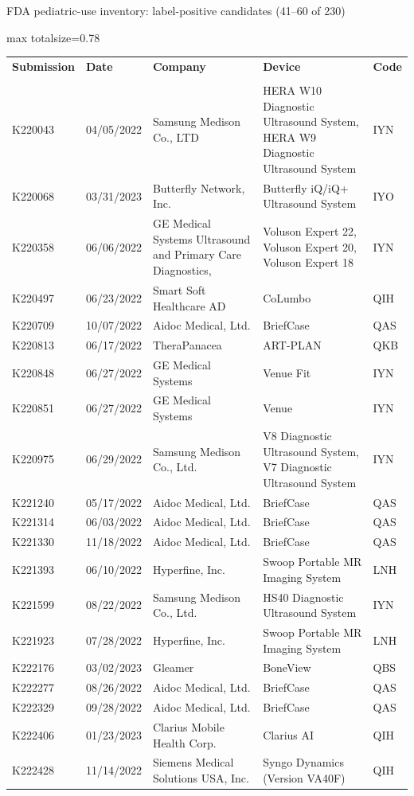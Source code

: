 \documentclass[aspectratio=169]{beamer}
\renewcommand{\arraystretch}{1.08}
\begin{document}
\begin{frame}[category=FDA appendix]{FDA pediatric-use inventory: label-positive candidates (41--60 of 230)}
\begin{adjustbox}{max totalsize={\textwidth}{0.78\textheight}}
\renewcommand{\arraystretch}{1.2}
\begin{tabular}{|p{}|p{}|p{}|p{}|p{}|}
\hline \textbf{Submission} & \textbf{Date} & \textbf{Company} & \textbf{Device} & \textbf{Code} \\\\ \hline
K220043 & 04/05/2022 & Samsung Medison Co., LTD & HERA W10 Diagnostic Ultrasound System, HERA W9 Diagnostic Ultrasound System & IYN \\ \hline
K220068 & 03/31/2023 & Butterfly Network, Inc. & Butterfly iQ/iQ+ Ultrasound System & IYO \\ \hline
K220358 & 06/06/2022 & GE Medical Systems Ultrasound and Primary Care Diagnostics, & Voluson Expert 22, Voluson Expert 20, Voluson Expert 18 & IYN \\ \hline
K220497 & 06/23/2022 & Smart Soft Healthcare AD & CoLumbo & QIH \\ \hline
K220709 & 10/07/2022 & Aidoc Medical, Ltd. & BriefCase & QAS \\ \hline
K220813 & 06/17/2022 & TheraPanacea & ART-PLAN & QKB \\ \hline
K220848 & 06/27/2022 & GE Medical Systems & Venue Fit & IYN \\ \hline
K220851 & 06/27/2022 & GE Medical Systems & Venue & IYN \\ \hline
K220975 & 06/29/2022 & Samsung Medison Co., Ltd. & V8 Diagnostic Ultrasound System, V7 Diagnostic Ultrasound System & IYN \\ \hline
K221240 & 05/17/2022 & Aidoc Medical, Ltd. & BriefCase & QAS \\ \hline
K221314 & 06/03/2022 & Aidoc Medical, Ltd. & BriefCase & QAS \\ \hline
K221330 & 11/18/2022 & Aidoc Medical, Ltd. & BriefCase & QAS \\ \hline
K221393 & 06/10/2022 & Hyperfine, Inc. & Swoop Portable MR Imaging System & LNH \\ \hline
K221599 & 08/22/2022 & Samsung Medison Co., Ltd. & HS40 Diagnostic Ultrasound System & IYN \\ \hline
K221923 & 07/28/2022 & Hyperfine, Inc. & Swoop Portable MR Imaging System & LNH \\ \hline
K222176 & 03/02/2023 & Gleamer & BoneView & QBS \\ \hline
K222277 & 08/26/2022 & Aidoc Medical, Ltd. & BriefCase & QAS \\ \hline
K222329 & 09/28/2022 & Aidoc Medical, Ltd. & BriefCase & QAS \\ \hline
K222406 & 01/23/2023 & Clarius Mobile Health Corp. & Clarius AI & QIH \\ \hline
K222428 & 11/14/2022 & Siemens Medical Solutions USA, Inc. & Syngo Dynamics (Version VA40F) & QIH \\ \hline
\end{tabular}
\end{adjustbox}
\end{frame}
\end{document}
